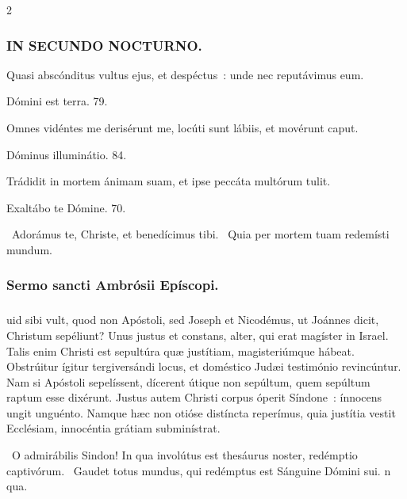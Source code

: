 \documentclass[9pt,twoside]{extarticle}
\begin{document}
\begin{multicols}{2}
\subsubsection*{\center \textsc{IN SECUNDO NOCTURNO.}}
\begin{tightlist}{}
\item {} Quasi abscónditus vultus ejus, et despéctus~: unde nec reputávimus eum.
\item {} Dómini est terra. 79.
\item {} Omnes vidéntes me derisérunt me, locúti sunt lábiis, et movérunt caput.
\item {} Dóminus illuminátio. 84.
\item {} Trádidit in mortem ánimam suam, et ipse peccáta multórum tulit.
\item {} Exaltábo te Dómine. 70.
\item {}~Adorámus te, Christe, et benedícimus tibi. ~Quia per mortem tuam redemísti mundum.
\end{tightlist}

\subsubsection*{\center Sermo sancti Ambrósii Epíscopi.}
\subsubsection*{\center {}}
uid sibi vult, quod non Apóstoli, sed Joseph et Nicodémus, ut Joánnes dicit, Christum sepéliunt? Unus justus et constans, alter, qui erat magíster in Israel. Talis enim Christi est sepultúra quæ justítiam, magisteriúmque hábeat. Obstrúitur ígitur tergiversándi locus, et doméstico Judæi testimónio revincúntur. Nam si Apóstoli sepelíssent, dícerent útique non sepúltum, quem sepúltum raptum esse dixérunt. Justus autem Christi corpus óperit Síndone~: ínnocens ungit unguénto. Namque hæc non otióse distíncta reperímus, quia justítia vestit Ecclésiam, innocéntia grátiam subminístrat.

\begin{tightlist}{}
\item {}~O admirábilis Sindon! \textred{*} In qua involútus est thesáurus noster, redémptio captivórum. ~Gaudet totus mundus, qui redémptus est Sánguine Dómini sui. n qua.
\end{tightlist}


\end{multicols}
\end{document}
